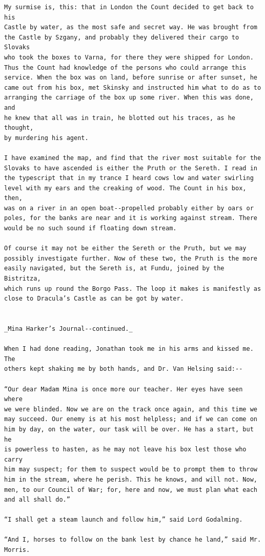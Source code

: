 \documentclass{article}
\begin{document}
\begin{verbatim}
My surmise is, this: that in London the Count decided to get back to his
Castle by water, as the most safe and secret way. He was brought from
the Castle by Szgany, and probably they delivered their cargo to Slovaks
who took the boxes to Varna, for there they were shipped for London.
Thus the Count had knowledge of the persons who could arrange this
service. When the box was on land, before sunrise or after sunset, he
came out from his box, met Skinsky and instructed him what to do as to
arranging the carriage of the box up some river. When this was done, and
he knew that all was in train, he blotted out his traces, as he thought,
by murdering his agent.

I have examined the map, and find that the river most suitable for the
Slovaks to have ascended is either the Pruth or the Sereth. I read in
the typescript that in my trance I heard cows low and water swirling
level with my ears and the creaking of wood. The Count in his box, then,
was on a river in an open boat--propelled probably either by oars or
poles, for the banks are near and it is working against stream. There
would be no such sound if floating down stream.

Of course it may not be either the Sereth or the Pruth, but we may
possibly investigate further. Now of these two, the Pruth is the more
easily navigated, but the Sereth is, at Fundu, joined by the Bistritza,
which runs up round the Borgo Pass. The loop it makes is manifestly as
close to Dracula’s Castle as can be got by water.


_Mina Harker’s Journal--continued._

When I had done reading, Jonathan took me in his arms and kissed me. The
others kept shaking me by both hands, and Dr. Van Helsing said:--

“Our dear Madam Mina is once more our teacher. Her eyes have seen where
we were blinded. Now we are on the track once again, and this time we
may succeed. Our enemy is at his most helpless; and if we can come on
him by day, on the water, our task will be over. He has a start, but he
is powerless to hasten, as he may not leave his box lest those who carry
him may suspect; for them to suspect would be to prompt them to throw
him in the stream, where he perish. This he knows, and will not. Now,
men, to our Council of War; for, here and now, we must plan what each
and all shall do.”

“I shall get a steam launch and follow him,” said Lord Godalming.

“And I, horses to follow on the bank lest by chance he land,” said Mr.
Morris.


\end{verbatim}
\end{document}
